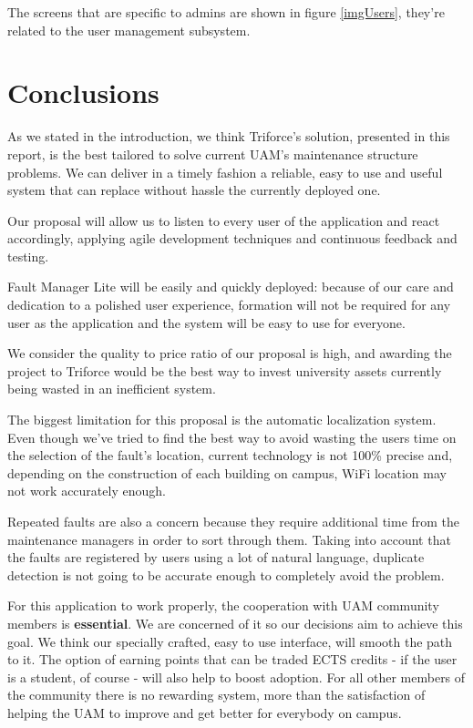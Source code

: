 \documentclass{report}
\begin{document}
The screens that are specific to admins are shown in figure \ref{imgUsers}, they're related to the user management subsystem.

\chapter{Conclusions}
\label{chapConclusions}

As we stated in the introduction, we think Triforce's solution, presented in this report, is the best tailored to solve current UAM's maintenance structure problems. We can deliver in a timely fashion a reliable, easy to use and useful system that can replace without hassle the currently deployed one.

Our proposal will allow us to listen to every user of the application and react accordingly, applying agile development techniques and continuous feedback and testing.

Fault Manager Lite will be easily and quickly deployed: because of our care and dedication to a polished user experience, formation will not be required for any user as the application and the system will be easy to use for everyone.

We consider the quality to price ratio of our proposal is high, and awarding the project to Triforce would be the best way to invest university assets currently being wasted in an inefficient system.

The biggest limitation for this proposal is the automatic localization system. Even though we've tried to find the best way to avoid wasting the users time on the selection of the fault's location, current technology is not 100\% precise and, depending on the construction of each building on campus, WiFi location may not work accurately enough.

Repeated faults are also a concern because they require additional time from the maintenance managers in order to sort through them. Taking into account that the faults are registered by users using a lot of natural language, duplicate detection is not going to be accurate enough to completely avoid the problem.

For this application to work properly, the cooperation with UAM community members is \textbf{essential}. We are concerned of it so our decisions aim to achieve this goal. We think our specially crafted, easy to use interface, will smooth the path to it. The option of earning points that can be traded ECTS credits - if the user is a student, of course - will also help to boost adoption. For all other members of the community there is no rewarding system, more than the satisfaction of helping the UAM to improve and get better for everybody on campus.
\end{document}

